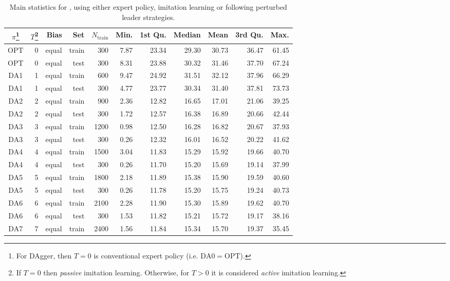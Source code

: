 \begin{table}[t]
\caption{Main statistics for  \namerho, using either expert
   policy, imitation learning or following perturbed leader 
   strategies.}\label{tbl:IL:stats} 
\noindent
\begin{minipage}{\textwidth}
\centering
\footnotesize
\begin{tabular}{c@{}rrrrrrrrrr}
  \toprule
  $\pi$\footnote{For DAgger, then $T=0$ is conventional expert policy (i.e. 
  $\text{DA}0=\text{OPT}$).}
  & $T$\footnote{If $T=0$ then \emph{passive} imitation learning. 
  Otherwise, for $T>0$ it is considered \emph{active} imitation learning.}
  & Bias & Set & $N_{\text{train}}$ & Min. & 1st Qu. & Median & 
  Mean & 3rd Qu. & Max. \\ 
  \midrule  
 OPT & 0 & equal & train & 300 & 7.87 & 23.34 & 29.30 & 30.73 & 36.47 & 61.45 \\ 
 OPT & 0 & equal & test & 300 & 8.31 & 23.88 & 30.32 & 31.46 & 37.70 & 67.24 \\ 
 DA1 & 1 & equal & train & 600 & 9.47 & 24.92 & 31.51 & 32.12 & 37.96 & 66.29 \\ 
 DA1 & 1 & equal & test & 300 & 4.77 & 23.77 & 30.34 & 31.40 & 37.81 & 73.73 \\ 
 DA2 & 2 & equal & train & 900 & 2.36 & 12.82 & 16.65 & 17.01 & 21.06 & 39.25 \\ 
 DA2 & 2 & equal & test & 300 & 1.72 & 12.57 & 16.38 & 16.89 & 20.66 & 42.44 \\ 
 DA3 & 3 & equal & train & 1200 & 0.98 & 12.50 & 16.28 & 16.82 & 20.67 & 37.93 \\ 
 DA3 & 3 & equal & test & 300 & 0.26 & 12.32 & 16.01 & 16.52 & 20.22 & 41.62 \\ 
 DA4 & 4 & equal & train & 1500 & 3.04 & 11.83 & 15.29 & 15.92 & 19.66 & 40.70 \\ 
 DA4 & 4 & equal & test & 300 & 0.26 & 11.70 & 15.20 & 15.69 & 19.14 & 37.99 \\ 
 DA5 & 5 & equal & train & 1800 & 2.18 & 11.89 & 15.38 & 15.90 & 19.59 & 40.60 \\ 
 DA5 & 5 & equal & test & 300 & 0.26 & 11.78 & 15.20 & 15.75 & 19.24 & 40.73 \\ 
 DA6 & 6 & equal & train & 2100 & 2.28 & 11.90 & 15.30 & 15.89 & 19.62 & 40.70 \\ 
 DA6 & 6 & equal & test & 300 & 1.53 & 11.82 & 15.21 & 15.72 & 19.17 & 38.16 \\ 
 DA7 & 7 & equal & train & 2400 & 1.56 & 11.84 & 15.34 & 15.70 & 19.37 & 35.45 \\ 

\end{tabular}
\end{minipage}
\end{table}
